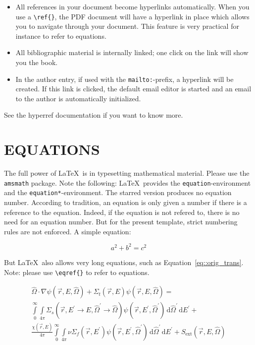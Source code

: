 \documentclass[12pt]{article}
\begin{document}
\begin{itemize}
\item All references in your document become hyperlinks automatically. When you use a \verb|\ref{}|, the PDF document will have a hyperlink in place which allows you to navigate through your document. This feature is very practical for instance to refer to equations.

\item All bibliographic material is internally linked; one click on the link will show you the book.

\item In the author entry, if used with the \verb|mailto:|-prefix, a hyperlink will be created. If this link is clicked, the default email editor is started and an email to the author is automatically initialized.
\end{itemize}

See the hyperref documentation if you want to know more.

%
\section{EQUATIONS}
\label{sect::equations}

The full power of \LaTeX\ is in typesetting mathematical material. Please use the \texttt{amsmath} package. Note the following: \LaTeX\ provides the \texttt{equation}-environment and the \texttt{equation*}-environment. The starred version produces no equation number. According to tradition, an equation is only given a number if there is a reference to the equation. Indeed, if the equation is not refered to, there is no need for an equation number. But for the present template, strict numbering rules are not enforced. A simple equation:

\begin{equation*}
  a^2 + b^2 = c^2
\end{equation*}

But \LaTeX\ also allows very long equations, such as Equation~\eqref{eq::orig_trans}. Note: please use \verb|\eqref{}| to refer to equations.

\begin{multline}
  \hat \Omega \cdot \nabla \psi ( \vec r, E, \hat \Omega )  + \Sigma_t ( \vec r, E ) \psi ( \vec r, E, \hat \Omega ) = \\ \int \limits_{0}^{\infty} \! \int \limits_{4 \pi} \! \Sigma_s ( \vec r, E^\prime \rightarrow E, \hat \Omega^\prime \rightarrow \hat \Omega ) \psi ( \vec r, E^\prime, \hat \Omega^\prime ) \, \mathrm{d}\hat \Omega^\prime \, \mathrm{d}E^\prime + \\ \frac{\chi ( \vec r, E )}{4\pi} \int \limits_0^\infty \! \int \limits_{4\pi} \nu \Sigma_f ( \vec r, E^\prime ) \psi ( \vec r, E^\prime, \hat \Omega^\prime ) \, \mathrm{d} \hat \Omega^\prime \, \mathrm{d}E^\prime + S_\text{ext} ( \vec r, E, \hat \Omega ) \label{eq::orig_trans}
\end{multline}
\end{document}
